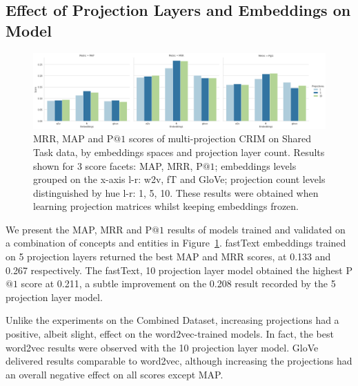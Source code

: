 \subsection{Effect of Projection Layers and Embeddings on Model}
\begin{figure}[ht!] 
  \centering
  \includegraphics[width=1.\linewidth]{images/semeval_crim_proj_embed.png}
  \caption[MRR, MAP and P$@1$ scores of CRIM on Shared Task data, by embeddings spaces and projection layer count]{MRR, MAP and P$@1$ scores of multi-projection CRIM on Shared Task data, by embeddings spaces and projection layer count.  Results shown for 3 score facets: MAP, MRR, P$@1$; embeddings levels grouped on the x-axis l-r: w2v, fT and GloVe; projection count levels distinguished by hue l-r: 1, 5, 10.  These results were obtained when learning projection matrices whilst keeping embeddings frozen. }
  \label{fig:semeval_crim_proj_embed}
\end{figure}
We present the \ac{MAP}, \ac{MRR} and P$@1$ results of models trained and validated on a combination of concepts and entities in Figure~\ref{fig:semeval_crim_proj_embed}.  fastText embeddings trained on 5  projection layers returned the best \ac{MAP} and \ac{MRR} scores, at 0.133 and 0.267 respectively.  The fastText, 10 projection layer model obtained the highest P$@1$ score at 0.211, a subtle improvement on the 0.208 result recorded by the 5 projection layer model.

Unlike the experiments on the Combined Dataset, increasing projections had a positive, albeit slight, effect on the word2vec-trained models.  In fact, the best word2vec results were observed with the 10 projection layer model.  GloVe delivered results comparable to word2vec, although increasing the projections had an overall negative effect on all scores except \ac{MAP}.

